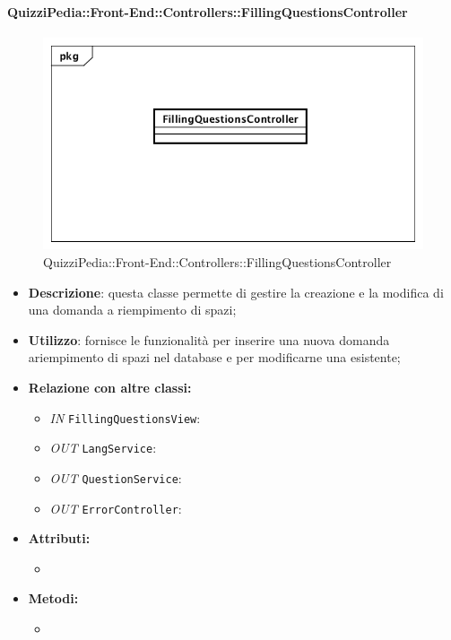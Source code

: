 \paragraph{QuizziPedia::Front-End::Controllers::FillingQuestionsController}
\begin{figure}
	\centering
	\includegraphics[scale=0.45]{UML/Classi/Front-End/QuizziPedia_Front-end_Controller_FillingQuestionsController.png}
	\caption{QuizziPedia::Front-End::Controllers::FillingQuestionsController}
\end{figure}
\begin{itemize}
	\item \textbf{Descrizione}: questa classe permette di gestire la creazione e la modifica di una domanda a riempimento di spazi;
	\item \textbf{Utilizzo}: fornisce le funzionalità per inserire una nuova domanda ariempimento di spazi nel database e per modificarne una esistente;
	\item \textbf{Relazione con altre classi:}
	\begin{itemize}
		\item \textit{IN} \texttt{FillingQuestionsView}:  
		\item \textit{OUT} \texttt{LangService}: 
		\item \textit{OUT} \texttt{QuestionService}:
		\item \textit{OUT} \texttt{ErrorController}: 
	\end{itemize}
	\item \textbf{Attributi:}
	\begin{itemize}
		\item 
	\end{itemize}
	\item \textbf{Metodi:}
	\begin{itemize}
		\item 
	\end{itemize}
\end{itemize}

